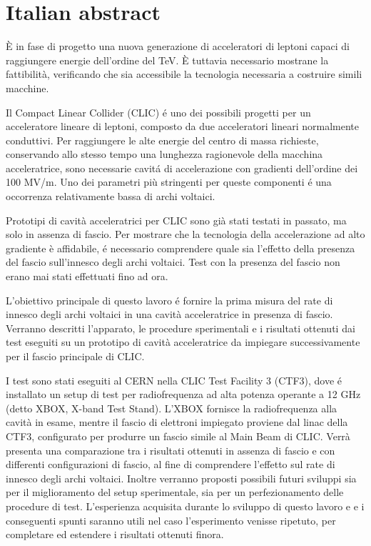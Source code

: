\chapter*{Italian abstract}

\`E in fase di progetto una nuova generazione di acceleratori di leptoni capaci di raggiungere energie dell'ordine del TeV. \`E tuttavia necessario mostrane la fattibilit\`a, verificando che sia accessibile la tecnologia necessaria a costruire simili macchine.

Il Compact Linear Collider (CLIC) é uno dei possibili progetti per un acceleratore lineare di leptoni, composto da due acceleratori lineari normalmente conduttivi. Per raggiungere le alte energie del centro di massa richieste, conservando allo stesso tempo una lunghezza ragionevole della macchina acceleratrice, sono necessarie cavitá di accelerazione con gradienti dell'ordine dei 100 MV/m. Uno dei parametri pi\`u stringenti per queste componenti é una occorrenza relativamente bassa di archi voltaici.

Prototipi di cavit\`a acceleratrici per CLIC sono gi\`a stati testati in passato, ma solo in assenza di fascio. Per mostrare che la tecnologia della accelerazione ad alto gradiente \`e affidabile, é necessario comprendere quale sia l'effetto della presenza del fascio sull'innesco degli archi voltaici. Test con la presenza del fascio non erano mai stati effettuati fino ad ora.

L'obiettivo principale di questo lavoro é fornire la prima misura del rate di innesco degli archi voltaici in una cavit\`a acceleratrice in presenza di fascio. Verranno descritti l'apparato, le procedure sperimentali e i risultati ottenuti dai test eseguiti su un prototipo di cavit\`a acceleratrice da impiegare successivamente per il fascio principale di CLIC.

I test sono stati eseguiti al CERN nella CLIC Test Facility 3 (CTF3), dove é installato un setup di test per radiofrequenza ad alta potenza operante a 12 GHz (detto XBOX, X-band Test Stand). L'XBOX fornisce la radiofrequenza alla cavit\`a in esame, mentre il fascio di elettroni impiegato proviene dal linac della CTF3, configurato per produrre un fascio simile al Main Beam di CLIC. Verr\`a presenta una comparazione tra i risultati ottenuti in assenza di fascio e con differenti configurazioni di fascio, al fine di comprendere l'effetto sul rate di innesco degli archi voltaici. Inoltre verranno proposti possibili futuri sviluppi sia per il miglioramento del setup sperimentale, sia per un perfezionamento delle procedure di test. L'esperienza acquisita durante lo sviluppo di questo lavoro e e i conseguenti spunti saranno utili nel caso l'esperimento venisse ripetuto, per completare ed estendere i risultati ottenuti finora.